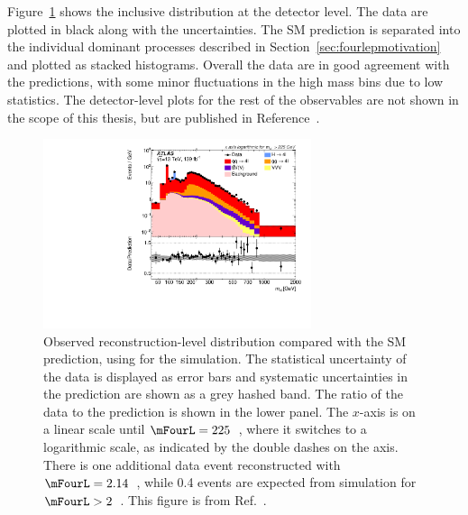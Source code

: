 Figure~\ref{fig:recoresults1} shows the inclusive \mFourL{} distribution at the detector level. The data are plotted in black along with the uncertainties. The SM prediction is separated into the individual dominant processes described in Section~\ref{sec:fourlepmotivation} and plotted as stacked histograms. 
Overall the data are in good agreement with the predictions, with some minor fluctuations in the high mass bins due to low statistics. The detector-level plots for the rest of the observables are not shown in the scope of this thesis, but are published in Reference~\cite{m4l2021_paper}. 
\begin{figure}[htb]
\centering
 \includegraphics[width = 0.7\textwidth]{Figures/m4l/Overlay_M4l_0__forPaper.pdf}
    \caption{Observed reconstruction-level \mFourL{} distribution compared with the SM prediction, using
      \SHERPA{} for the \qqFourL{} simulation.
     The statistical uncertainty of the
      data is displayed as error bars and systematic uncertainties
      in the prediction are shown as a grey hashed band.  The
      ratio of the data to the prediction is shown in the lower
      panel.  The $x$-axis is on a linear scale until $\mFourL = 225$~\GeV,
where it switches to a logarithmic scale, as indicated by the double
dashes on the axis.
      There is one additional data event reconstructed with 
$\mFourL = 2.14$~\TeV, while 0.4 events are expected from simulation for
$\mFourL > 2$~\TeV. This figure is from Ref.~\cite{m4l2021_paper}. \label{fig:recoresults1}}
\end{figure}
